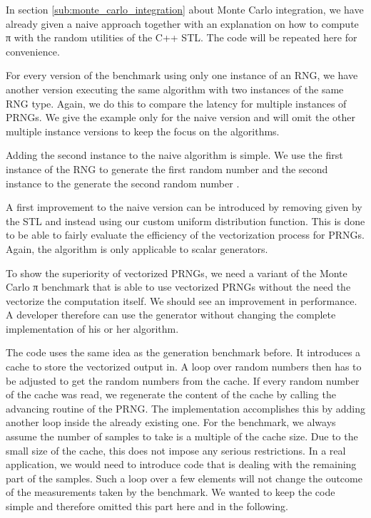 \documentclass{stdlocal}
\begin{document}
    In section \ref{sub:monte_carlo_integration} about Monte Carlo integration, we have already given a naive approach together with an explanation on how to compute π with the random utilities of the C++ STL.
    The code will be repeated here for convenience.

    For every version of the benchmark using only one instance of an RNG, we have another version executing the same algorithm with two instances of the same RNG type.
    Again, we do this to compare the latency for multiple instances of PRNGs.
    We give the example only for the naive version and will omit the other multiple instance versions to keep the focus on the algorithms.

    Adding the second instance to the naive algorithm is simple.
    We use the first instance of the RNG to generate the first random number  and the  second instance to the generate the second random number .

    A first improvement to the naive version can be introduced by removing  given by the STL and instead using our custom uniform distribution function.
    This is done to be able to fairly evaluate the efficiency of the vectorization process for PRNGs.
    Again, the algorithm is only applicable to scalar generators.

    To show the superiority of vectorized PRNGs, we need a variant of the Monte Carlo π benchmark that is able to use vectorized PRNGs without the need the vectorize the computation itself.
    We should see an improvement in performance.
    A developer therefore can use the generator without changing the complete implementation of his or her algorithm.

    The code uses the same idea as the generation benchmark before.
    It introduces a cache to store the vectorized output in.
    A loop over random numbers then has to be adjusted to get the random numbers from the cache.
    If every random number of the cache was read, we regenerate the content of the cache by calling the advancing routine of the PRNG.
    The implementation accomplishes this by adding another  loop inside the already existing one.
    For the benchmark, we always assume the number of samples to take is a multiple of the cache size.
    Due to the small size of the cache, this does not impose any serious restrictions.
    In a real application, we would need to introduce code that is dealing with the remaining part of the samples.
    Such a loop over a few elements will not change the outcome of the measurements taken by the benchmark.
    We wanted to keep the code simple and therefore omitted this part here and in the following.
\end{document}
